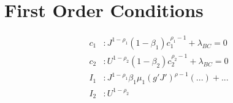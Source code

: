 \documentclass[10pt]{article}
\begin{document}
\section{First Order Conditions}

  \begin{align*}
    c_1 &: J^{1 - \rho_1} (1 - \beta_1) c_1^{\rho_1 - 1} + \lambda_{BC} = 0 \\
    c_2 &: U^{1 - \rho_2} (1 - \beta_2) c_2^{\rho_2 - 1} + \lambda_{BC} = 0 \\
    I_1 &: J^{1 - \rho_1} \beta_1 \mu_1(g' J')^{\rho - 1} (...) + \text{...} \\
    I_2 &: U^{1 - \rho_2}
  \end{align*}
\end{document}

